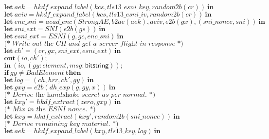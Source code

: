 \documentclass{article}
\newcommand{\kwl}[1]{\mathbf{#1}}
\newcommand{\kwt}[1]{\mathsf{#1}}
\newcommand{\var}[1]{\mathit{#1}}
\theoremstyle{definition}
\begin{document}
\begin{tabbing}
$\ \ \ \ \ \kwl{let}\ \var{aek} = \var{hkdf{\_}expand{\_}label}(\var{kcs}, \var{tls13{\_}esni{\_}key}, \var{random2b}(\var{cr}))\ \kwl{in} $\\
$\ \ \ \ \ \kwl{let}\ \var{aeiv} = \var{hkdf{\_}expand{\_}label}(\var{kcs}, \var{tls13{\_}esni{\_}iv}, \var{random2b}(\var{cr}))\ \kwl{in} $\\
$\ \ \ \ \ \kwl{let}\ \var{enc{\_}sni} = \var{aead{\_}enc}(\var{StrongAE}, \var{b2ae}(\var{aek}), \var{aeiv}, \var{e2b}(\var{gx}), (\var{sni{\_}nonce}, \var{sni}))\ \kwl{in} $\\
$\ \ \ \ \ \kwl{let}\ \var{sni{\_}ext} = \var{SNI}(\var{e2b}(\var{gs}))\ \kwl{in} $\\
$\ \ \ \ \ \kwl{let}\ \var{esni{\_}ext} = \var{ESNI}(\var{g}, \var{gc}, \var{enc{\_}sni})\ \kwl{in} $\\
$ $\\
$\ \ \ \ \ \textit{(* Write out the CH and get a server flight in response *)} $\\
$\ \ \ \ \ \kwl{let}\ \var{ch'} = (\var{cr}, \var{gx}, \var{sni{\_}ext}, \var{esni{\_}ext})\ \kwl{in} $\\
$\ \ \ \ \ \kwl{out}(\var{io}, \var{ch'}); $\\
$\ \ \ \ \ \kwl{in}\ (\var{io}, (\var{gy}{:}\var{element}, \var{msg}{:}\kwt{bitstring})); $\\
$ $\\
$\ \ \ \ \ \kwl{if}\ \var{gy}\neq\var{BadElement}\ \kwl{then} $\\
$\ \ \ \ \ \kwl{let}\ \var{log} = (\var{ch}, \var{hrr}, \var{ch'}, \var{gy})\ \kwl{in} $\\
$\ \ \ \ \ \kwl{let}\ \var{gxy} = \var{e2b}(\var{dh{\_}exp}(\var{g}, \var{gy}, \var{x}))\ \kwl{in} $\\
$ $\\
$\ \ \ \ \ \textit{(* Derive the handshake secret as per normal. *)} $\\
$\ \ \ \ \ \kwl{let}\ \var{kxy'} = \var{hkdf{\_}extract}(\var{zero}, \var{gxy})\ \kwl{in} $\\
$ $\\
$\ \ \ \ \ \textit{(* Mix in the ESNI nonce. *)} $\\
$\ \ \ \ \ \kwl{let}\ \var{kxy} = \var{hkdf{\_}extract}(\var{kxy'}, \var{random2b}(\var{sni{\_}nonce}))\ \kwl{in} $\\
$ $\\
$\ \ \ \ \ \textit{(* Derive remaining key material. *)} $\\
$\ \ \ \ \ \kwl{let}\ \var{aek} = \var{hkdf{\_}expand{\_}label}(\var{kxy}, \var{tls13{\_}key}, \var{log})\ \kwl{in} $\\

\end{tabbing}
\end{document}
